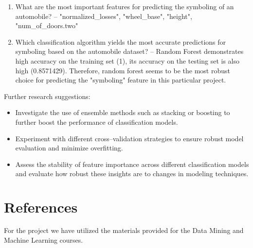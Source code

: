 \documentclass[11pt,a4paper]{article}\usepackage[]{graphicx}\usepackage[]{xcolor}
\begin{document}
\begin{enumerate}
\item What are the most important features for predicting the symboling of an automobile? --  "normalized\_losses", "wheel\_base", "height", "num\_of\_doors.two"



\item Which classification algorithm yields the most accurate predictions for symboling
based on the automobile dataset? -- Random Forest demonstrates high accuracy on the training set (1), its accuracy on the testing set is also high (0.8571429). Therefore, random forest seems to be the most robust choice for predicting the "symboling" feature in this particular project.

\end{enumerate}




Further research suggestions:
\begin{itemize}
\item Investigate the use of ensemble methods such as stacking or boosting to further boost the performance of classification models.
\item Experiment with different cross--validation strategies to ensure robust model evaluation and minimize overfitting.
\item Assess the stability of feature importance across different classification models and evaluate how robust these insights are to changes in modeling techniques.
\end{itemize}






	\section*{References}
	For the project we have utilized the materials provided for the Data Mining and Machine Learning courses. 
	
\end{document}
